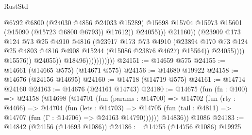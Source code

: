 \begin{lexlean}{RustStd}
\begin{coremodule}
                                                      @6792
                                                      @6800
                                                      (@24030 @4856 @24033 @15289)
                                                      @15698
                                                      @15704
                                                      @15973
                                                      @15601
                                                      (@15090 (@15723 @6800 @6793))
                                                      @17612))
                                                  @24055)))
                                            @21160))
                                        (@23909
                                          @173
                                          @124
                                          @73
                                          @25
                                          @4910
                                          @4816
                                          (@23917
                                            @173
                                            @73
                                            @4910
                                            (@23894
                                              @170
                                              @73
                                              @124
                                              @25
                                              @4803
                                              @4816
                                              @4908
                                              @15244
                                              (@15086 @23876 @4627)
                                              @15564))
                                          @24055))))
                                  @15576))
                              @24055))
                          @18496)))))))))))
@24151 := @14659 @575
@24155 := @14661 (@14665 @575) (@14671 @575)
@24156 := @14680 @19922
@24158 := @14676 (@24156 @14695)
@24160 := @14718 (@14719 @575)
@24161 := @14714 @24160
@24163 := @14676 (@24161 @14743)
@24180 := @14675
    (fun (fn : @100) =>
    @24158
      (@14698
        (@14701
          (fun (params : @14700) =>
          @14702
            (fun (rty : @4466) =>
            @14704
              (fun (lets : @14703) =>
              @14705 (fun (tail : @4811) => @14707 (fun (Γ : @14706) => @24163 @14790))))))
        @14836))
    @1086
@24183 := @14842 (@24156 (@14693 @1086))
@24186 := @14755 (@14756 @1086) @19925

\end{coremodule}
\end{lexlean}
